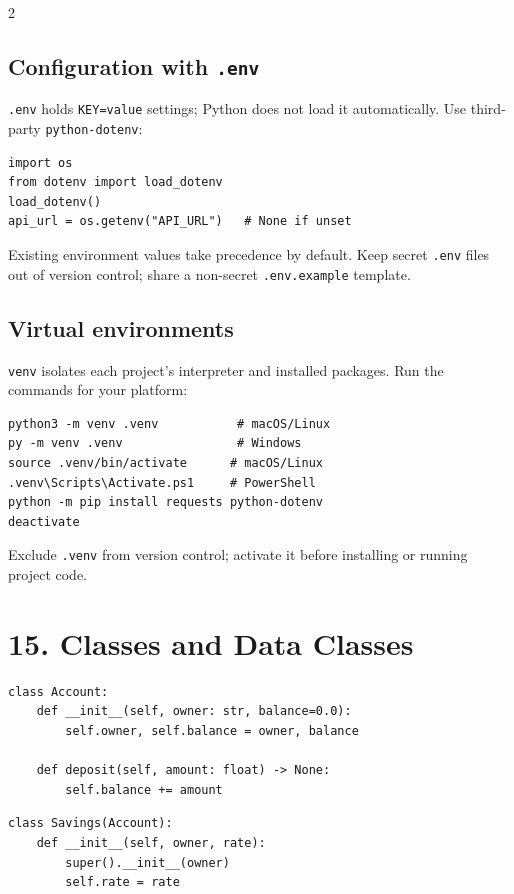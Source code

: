 \documentclass[10pt,a4paper]{article}
\newcommand{\py}[1]{\texttt{#1}}
\begin{document}
\begin{multicols}{2}
\subsection{Configuration with \texttt{.env}}

\py{.env} holds \py{KEY=value} settings; Python does not load it automatically. Use third-party \py{python-dotenv}:

\begin{lstlisting}
import os
from dotenv import load_dotenv
load_dotenv()
api_url = os.getenv("API_URL")   # None if unset
\end{lstlisting}

Existing environment values take precedence by default. Keep secret \py{.env} files out of version control; share a non-secret \py{.env.example} template.

\subsection{Virtual environments}

\py{venv} isolates each project's interpreter and installed packages. Run the commands for your platform:

\begin{lstlisting}
python3 -m venv .venv           # macOS/Linux
py -m venv .venv                # Windows
source .venv/bin/activate      # macOS/Linux
.venv\Scripts\Activate.ps1     # PowerShell
python -m pip install requests python-dotenv
deactivate
\end{lstlisting}

Exclude \py{.venv} from version control; activate it before installing or running project code.

\section{15. Classes and Data Classes}

\begin{lstlisting}
class Account:
    def __init__(self, owner: str, balance=0.0):
        self.owner, self.balance = owner, balance

    def deposit(self, amount: float) -> None:
        self.balance += amount
\end{lstlisting}

\begin{lstlisting}
class Savings(Account):
    def __init__(self, owner, rate):
        super().__init__(owner)
        self.rate = rate


\end{lstlisting}
\end{multicols}
\end{document}
